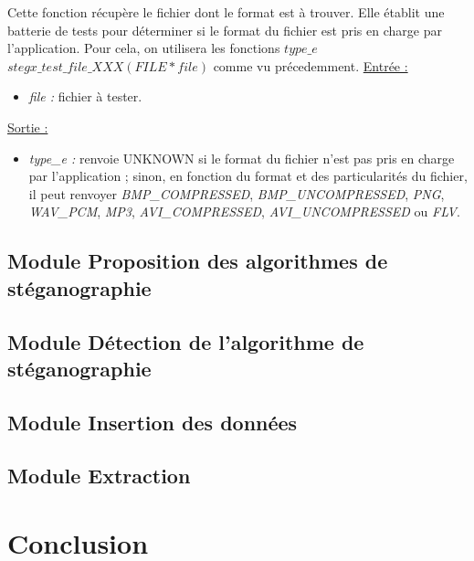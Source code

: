 \documentclass[11pt]{article}
\begin{document}
Cette fonction récupère le fichier dont le format est à trouver. Elle établit une 
batterie de tests pour déterminer si le format du fichier est pris en charge 
par l'application. 
Pour cela, on utilisera les fonctions 
$type\_e$ $stegx\_test\_file\_XXX (FILE* file)$ comme vu précedemment. 
\newline
\underline{Entrée :} 
\begin{itemize}
\item \textit{file :} fichier à tester. 
\end{itemize}
\underline{Sortie :} 
\begin{itemize}
\item \textit{type\_e :} renvoie UNKNOWN si le format du fichier n'est pas pris en 
charge par l'application ; sinon, en fonction du format et des particularités 
du fichier, il peut renvoyer \textit{BMP\_COMPRESSED}, \textit{BMP\_UNCOMPRESSED}, 
\textit{PNG}, \textit{WAV\_PCM}, \textit{MP3}, \textit{AVI\_COMPRESSED}, 
\textit{AVI\_UNCOMPRESSED} ou \textit{FLV}. 
\newline 
\end{itemize}



\subsection{Module Proposition des algorithmes 
de stéganographie}
\subsection{Module Détection de l'algorithme de
stéganographie}
\subsection{Module Insertion des données}
\subsection{Module Extraction}

\section{Conclusion}
\end{document}
